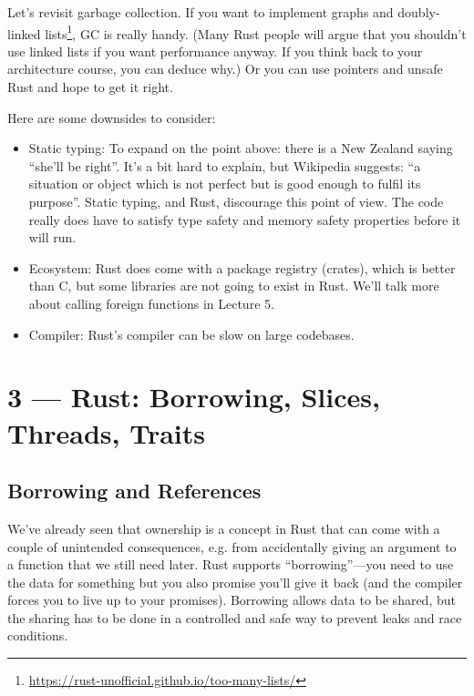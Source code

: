 \documentclass[a4paper]{report}
\newcommand{\CPP}{C\nolinebreak\hspace{-.05em}\raisebox{.4ex}{\tiny\bf +}\nolinebreak\hspace{-.10em}\raisebox{.4ex}{\tiny\bf +}}
\def\CPP{{C\nolinebreak[4]\hspace{-.05em}\raisebox{.4ex}{\tiny\bf ++}}}
\begin{document}
Let's revisit garbage collection. If you want
to implement graphs and doubly-linked lists\footnote{\url{https://rust-unofficial.github.io/too-many-lists/}}, GC is really handy. (Many
Rust people will argue that you shouldn't use linked lists if you want
performance anyway. If you think back to your architecture course, you
can deduce why.) Or you can use pointers and unsafe Rust and hope to
get it right.


Here are some downsides to consider:
\begin{itemize}
\item Static typing: To expand on the point above: there is a New Zealand saying ``she'll be right''. It's a bit hard to explain, but Wikipedia suggests: ``a situation or object which is not perfect but is good enough to fulfil its purpose''. Static typing, and Rust, discourage this point of view. The code really does have to satisfy type safety and memory safety properties before it will run.
\item Ecosystem: Rust does come with a package registry (crates), which is better than \CPP, but some libraries are not going to exist in Rust. We'll talk more about calling foreign functions in Lecture 5.
\item Compiler: Rust's compiler can be slow on large codebases.
\end{itemize}










\chapter*{3 --- Rust: Borrowing, Slices, Threads, Traits}


\section*{Borrowing and References}
We've already seen that ownership is a concept in Rust that can come with a couple of unintended consequences, e.g. from accidentally giving an argument to a function that we still need later. Rust supports ``borrowing''---you need to use the data for something but you also promise you'll give it back (and the compiler forces you to live up to your promises). Borrowing allows data to be shared, but the sharing has to be done in a controlled and safe way to prevent leaks and race conditions.
\end{document}

